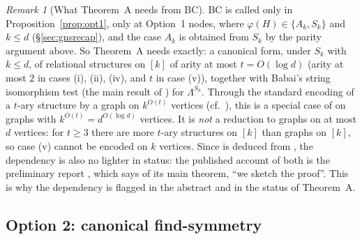 \documentclass[11pt]{article}
\theoremstyle{plain}
\theoremstyle{definition}
\theoremstyle{remark}
\newtheorem{remark}[theorem]{Remark}
\theoremstyle{named}
\theoremstyle{namedrm}
\begin{document}
\begin{remark}[What Theorem~A needs from BC]\label{rem:BC}
BC is called only in Proposition~\ref{prop:opt1}, only at Option~1 nodes, where $\varphi(H)\in\{A_k,S_k\}$ and
$k\le d$ (\S\ref{sec:gnsrecap}), and the case $A_k$ is obtained from $S_k$ by the parity argument above. So
Theorem~A needs exactly: a canonical form, under $S_k$ with $k\le d$, of relational structures on $[k]$ of
arity at most $t=O(\log d)$ (arity at most $2$ in cases (i), (ii), (iv), and $t$ in case (v)), together with Babai's
string isomorphism test \cite[Thm.~2.1]{Bab19} (the main result of \cite{Bab15}) for $\Lambda^{S_k}$. Through
the standard encoding of a $t$-ary structure by a graph on $k^{O(t)}$ vertices (cf.\ \cite[proof of
Lemma~4.33]{Neu20}), this is a special case of \cite[Cor.~2.3]{Bab19} on graphs with $k^{O(t)}=d^{O(\log d)}$
vertices. It is \emph{not} a reduction to graphs on at most $d$ vertices: for $t\ge3$ there are more $t$-ary
structures on $[k]$ than graphs on $[k]$, so case (v) cannot be encoded on $k$ vertices. Since
\cite[Cor.~2.3]{Bab19} is deduced from \cite[Thm.~2.2]{Bab19}, the dependency is also no lighter in
status: the published account of both is the preliminary report \cite{Bab19}, which says of its
main theorem, ``we sketch the proof''. This is why the dependency is flagged in the abstract and in
the status of Theorem~A.
\end{remark}

\subsection{Option 2: canonical find-symmetry}
\end{document}
